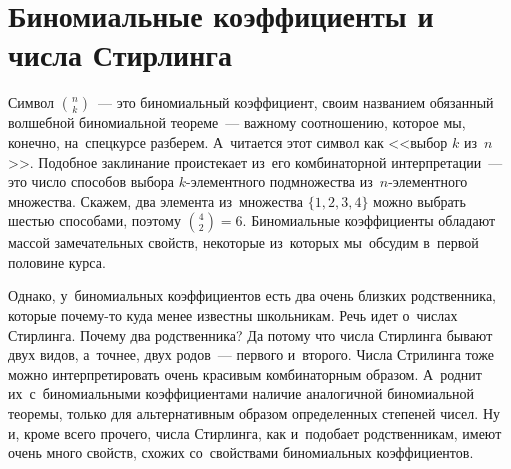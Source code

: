 
\section*{Биномиальные коэффициенты и числа Стирлинга}



Символ $\binom{n}{k}$~--- это биномиальный коэффициент, своим названием
обязанный волшебной биномиальной теореме~--- важному соотношению, которое мы,
конечно, на~спецкурсе разберем.
А~читается этот символ как <<выбор $k$ из~$n$>>.
Подобное заклинание проистекает из~его комбинаторной интерпретации~--- это
число способов выбора $k$-элементного подмножества из~$n$-элементного
множества.
Скажем, два элемента из~множества $\{ 1, 2, 3, 4 \}$ можно выбрать шестью
способами, поэтому $\binom{4}{2} = 6$.
Биномиальные коэффициенты обладают массой замечательных свойств, некоторые
из~которых мы~обсудим в~первой половине курса. 
 
Однако, у~биномиальных коэффициентов есть два очень близких родственника,
которые почему-то куда менее известны школьникам.
Речь идет о~числах Стирлинга.
Почему два родственника?
Да потому что числа Стирлинга бывают двух видов, а~точнее, двух родов~---
первого и~второго.
Числа Стрилинга тоже можно интерпретировать очень красивым комбинаторным
образом.
А~роднит их~с~биномиальными коэффициентами наличие аналогичной биномиальной
теоремы, только для альтернативным образом определенных степеней чисел.
Ну и, кроме всего прочего, числа Стирлинга, как и~подобает родственникам,
имеют очень много свойств, схожих со~свойствами биномиальных коэффициентов.


